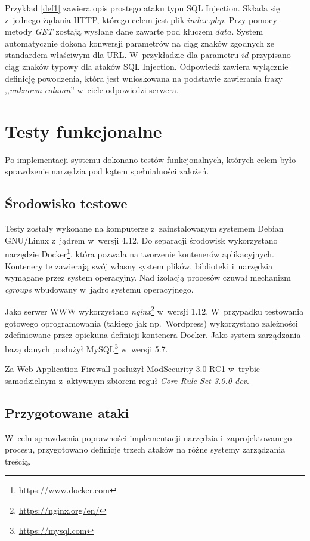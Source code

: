 \documentclass[12pt,a4paper,polish,thesis]{dcsbook}
\begin{document}
Przykład \ref{def1} zawiera opis prostego ataku typu SQL Injection. Składa się z~jednego żądania HTTP, którego celem jest plik $index.php$. Przy pomocy metody \textit{GET} zostają wysłane dane zawarte pod kluczem $data$. System automatycznie dokona konwersji parametrów na ciąg znaków zgodnych ze standardem właściwym dla URL. W~przykładzie dla parametru $id$ przypisano ciąg znaków typowy dla ataków SQL Injection.
Odpowiedź zawiera wyłącznie definicję powodzenia, która jest wnioskowana na podstawie zawierania frazy ,,\textit{unknown column}'' w~ciele odpowiedzi serwera.


\chapter{Testy funkcjonalne}
Po implementacji systemu dokonano testów funkcjonalnych, których celem było sprawdzenie narzędzia pod kątem spełnialności założeń. 

\section{Środowisko testowe}
Testy zostały wykonane na komputerze z~zainstalowanym systemem Debian GNU/Linux z~jądrem w~wersji 4.12. Do separacji środowisk wykorzystano narzędzie Docker\footnote{\url{https://www.docker.com}}, która pozwala na tworzenie kontenerów aplikacyjnych. Kontenery te zawierają swój własny system plików, biblioteki i~narzędzia wymagane przez system operacyjny. Nad izolacją procesów czuwał mechanizm \textit{cgroups} wbudowany w~jądro systemu operacyjnego.

Jako serwer WWW wykorzystano \textit{nginx}\footnote{\url{https://nginx.org/en/}} w~wersji 1.12. W~przypadku testowania gotowego oprogramowania (takiego jak np.~Wordpress) wykorzystano zależności zdefiniowane przez opiekuna definicji kontenera Docker. Jako system zarządzania bazą danych posłużył MySQL\footnote{\url{https://mysql.com}} w~wersji 5.7.

Za Web Application Firewall posłużył ModSecurity 3.0 RC1 w~trybie samodzielnym z~aktywnym zbiorem reguł \textit{Core Rule Set 3.0.0-dev}.


\section{Przygotowane ataki}
 W~celu sprawdzenia poprawności implementacji narzędzia i~zaprojektowanego procesu, przygotowano definicje trzech ataków na różne systemy zarządzania treścią. 
\end{document}
